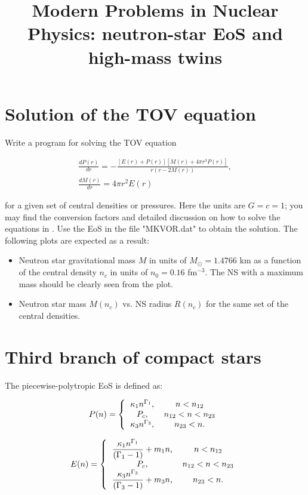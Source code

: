 \documentclass[12pt]{article}
\title{Modern Problems in Nuclear Physics: neutron-star EoS and high-mass twins}
\date{}
\begin{document}
\maketitle


\section{Solution of the TOV equation}

Write a program for solving the TOV equation

\begin{gather}
	\frac{dP(r)}{dr} = - \frac{ [E(r) + P(r)] [M(r) + 4 \pi r^3 P(r)]} {r (r - 2 M(r))}, \\
	\frac{dM(r)}{dr} = 4 \pi r^2 E(r)
\end{gather}

for a given set of central densities or pressures. Here the units are $G = c = 1$; you may find the conversion factors and detailed discussion on how to solve the equations in \cite{Glend}. Use the EoS in the file "MKVOR.dat" to obtain the solution. The following plots are expected as a result:
\begin{itemize}
	\item Neutron star gravitational mass $M$ in units of $M_\odot = 1.4766$ km as a function of the central density $n_c$ in units of $n_0 = 0.16$ fm$^{-3}$. The NS with a maximum mass should be clearly seen from the plot.
	\item Neutron star mass $M(n_c)$ vs. NS radius $R(n_c)$ for the same set of the central densities.
\end{itemize}


\section{Third branch of compact stars}

The piecewise-polytropic EoS is defined as:

\begin{gather}
P(n) = 
\left\{
\begin{tabular}{cc}
$\kappa_1 n^{\Gamma_1}$, & $n < n_{12}$\\
$P_c$,& $n_{12} < n < n_{23}$ \\
$\kappa_3 n^{\Gamma_3}$, & $n_{23} < n$.
\end{tabular}
\right.
\end{gather}

\begin{gather}
E(n) = 
\left\{
\begin{tabular}{cc}
$\dfrac{\kappa_1 n^{\Gamma_1}}{(\Gamma_1 - 1)} + m_1 n$, & $n < n_{12}$\\
$P_c$,& $n_{12} < n < n_{23}$ \\
$\dfrac{\kappa_3 n^{\Gamma_3}}{(\Gamma_3 - 1)} + m_3 n$, & $n_{23} < n$.
\end{tabular}
\right.
\end{gather}
\end{document}
